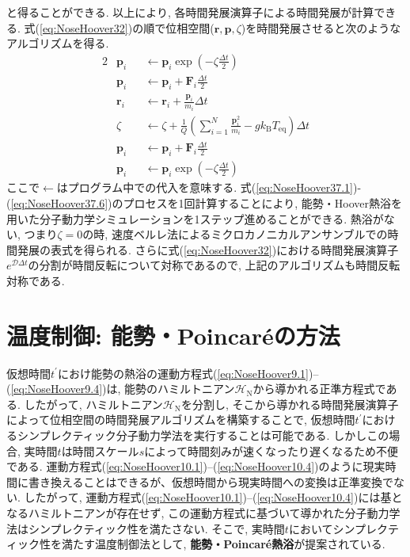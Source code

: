 と得ることができる.
以上により, 各時間発展演算子による時間発展が計算できる.
式(\ref{eq:NoseHoover32})の順で位相空間($\bm{r},\bm{p},\zeta$)を時間発展させると次のようなアルゴリズムを得る.
\begin{alignat}{2}
 &\bm{p}_{i} &&\gets \bm{p}_{i} \exp \left(-\zeta \frac{\Delta t}{2}\right)
 \label{eq:NoseHoover37.1}
 \\
 &\bm{p}_{i} &&\gets \bm{p}_{i} + \bm{F}_{i} \frac{\Delta t}{2}
 \label{eq:NoseHoover37.2}
 \\
 &\bm{r}_{i} &&\gets \bm{r}_{i} + \frac{\bm{p}_{i}}{m_{i}} \Delta t
 \label{eq:NoseHoover37.3}
 \\
 &\zeta          &&\gets \zeta
                           + \frac{1}{Q}
                           \left(
                           \sum_{i=1}^{N} \frac{\bm{p}_{i}^{2}}{m_{i}}
                           - g k_{\mathrm{B}} T_{\mathrm{eq}}
                           \right) \Delta t
 \label{eq:NoseHoover37.4}
 \\
 &\bm{p}_{i} &&\gets \bm{p}_{i} + \bm{F}_{i} \frac{\Delta t}{2}
 \label{eq:NoseHoover37.5}
 \\
 &\bm{p}_{i} &&\gets \bm{p}_{i} \exp \left(-\zeta \frac{\Delta t}{2}\right)
 \label{eq:NoseHoover37.6}
\end{alignat}
ここで$\gets$はプログラム中での代入を意味する.
式(\ref{eq:NoseHoover37.1})-(\ref{eq:NoseHoover37.6})のプロセスを1回計算することにより, 能勢・Hoover熱浴を用いた分子動力学シミュレーションを1ステップ進めることができる.
熱浴がない, つまり$\zeta=0$の時, 速度ベルレ法によるミクロカノニカルアンサンブルでの時間発展の表式を得られる.
さらに式(\ref{eq:NoseHoover32})における時間発展演算子$e^{\mathcal{D} \Delta t}$の分割が時間反転について対称であるので, 上記のアルゴリズムも時間反転対称である.

\section{温度制御: 能勢・Poincar\'{e}の方法}
仮想時間$t^{\prime}$におけ能勢の熱浴の運動方程式(\ref{eq:NoseHoover9.1})--(\ref{eq:NoseHoover9.4})は, 能勢のハミルトニアン$\mathcal{H}_{\mathrm{N}}$から導かれる正準方程式である.
したがって, ハミルトニアン$\mathcal{H}_{\mathrm{N}}$を分割し, そこから導かれる時間発展演算子によって位相空間の時間発展アルゴリズムを構築することで, 仮想時間$t^{\prime}$におけるシンプレクティック分子動力学法を実行することは可能である. しかしこの場合, 実時間$t$は時間スケール$s$によって時間刻みが速くなったり遅くなるため不便である. 運動方程式(\ref{eq:NoseHoover10.1})--(\ref{eq:NoseHoover10.4})のように現実時間に書き換えることはできるが、仮想時間から現実時間への変換は正準変換でない. したがって, 運動方程式(\ref{eq:NoseHoover10.1})--(\ref{eq:NoseHoover10.4})には基となるハミルトニアンが存在せず, この運動方程式に基づいて導かれた分子動力学法はシンプレクティック性を満たさない. そこで, 実時間$t$においてシンプレクティック性を満たす温度制御法として, \textbf{能勢・Poincar\'{e}熱浴}が提案されている.

